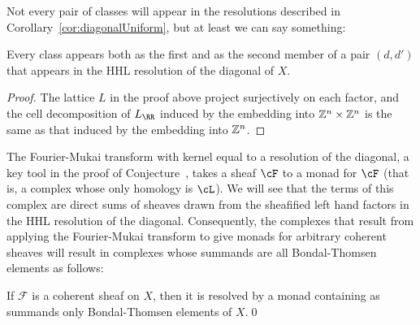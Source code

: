 \documentclass{amsart}
\begin{document}
Not every pair of \BT classes will appear in the resolutions described in Corollary~\ref{cor:diagonalUniform},
but at least we can say something:
\begin{cor}\label{cor:diagonal-BTcollection}
Every \BT class appears both as the first and as the second member of a pair $(d,d')$ that appears in the HHL resolution of the diagonal of $X$. \end{cor}
\begin{proof}
The lattice $L$ in the proof above project surjectively on each factor, and the cell decomposition of $L_{\RR}$
induced by the embedding into $\mathbb Z^{n}\times \mathbb Z^{n}$ is the same as that induced by the embedding into
$\mathbb Z^{n}$.
\end{proof}

The Fourier-Mukai transform with kernel equal to a resolution of the diagonal,  a key tool in the proof of Conjecture~\cite{BES20}, takes a sheaf $\cF$ to a monad for $\cF$ (that is, a complex whose only homology is $\cL$).  We will see  that the terms of this complex are direct sums of sheaves
 drawn from the sheafified left hand factors in the HHL resolution of the diagonal. Consequently, the complexes that result from applying the Fourier-Mukai transform to give monads for arbitrary coherent sheaves will result in complexes whose summands are all Bondal-Thomsen elements as follows:

\begin{cor}
  If $\mathcal{F}$ is a coherent sheaf on $X$, then it is resolved by a monad containing as summands only Bondal-Thomsen elements of $X$.\qed
\end{cor}
\end{document}
